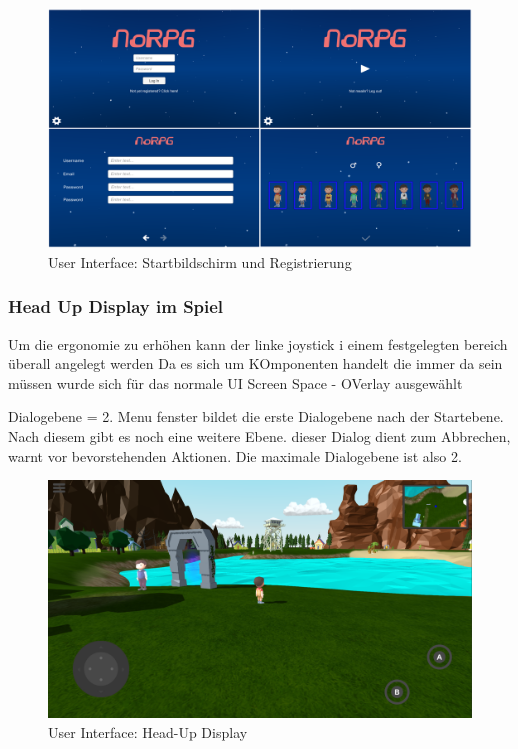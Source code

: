 			\begin{figure}[htbp]
				\centering 
				\label{StartAndRegisterUI}
				\includegraphics[width=\textwidth]{pics/beforeGameStarts.png}
				\caption{User Interface: Startbildschirm und Registrierung}
			\end{figure}
		
		\subsubsection{Head Up Display im Spiel}
			Um die ergonomie zu erhöhen kann der linke joystick i einem festgelegten bereich überall angelegt werden
			Da es sich um KOmponenten handelt die immer da sein müssen wurde sich für das normale UI Screen Space - OVerlay ausgewählt
			
			Dialogebene = 2. Menu fenster bildet die erste Dialogebene nach der Startebene. Nach diesem gibt es noch eine weitere Ebene. dieser Dialog dient zum Abbrechen, warnt vor bevorstehenden Aktionen. Die maximale Dialogebene ist also 2. 
			
			\begin{figure}[htbp]
				\centering 
				\label{alwaysOnUI}
				\includegraphics[width=13cm]{pics/alwaysOnUI.png}
				\caption{User Interface: Head-Up Display}
			\end{figure}
		
